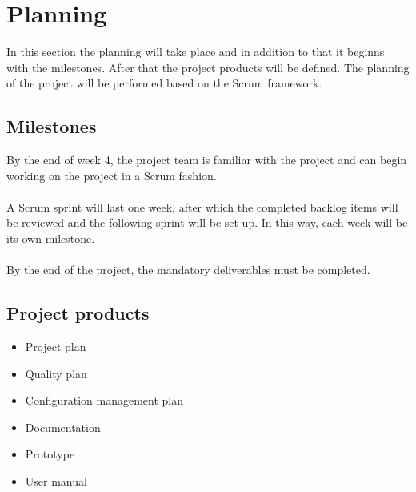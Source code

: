 \section{Planning}
In this section the planning will take place and in addition to that it beginns with the milestones.
After that the project products will be defined. The planning of the project will be performed based on the Scrum framework.

    \subsection{Milestones}
    By the end of week 4, the project team is familiar with the project and can begin working on the project in a Scrum fashion.\\\\
    A Scrum sprint will last one week, after which the completed backlog items will be reviewed and the following sprint will be set up. In this way, each week will be its own milestone.\\\\
    By the end of the project, the mandatory deliverables must be completed.
    
    \subsection{Project products}
    \begin{itemize}
        \item Project plan
        \item Quality plan
        \item Configuration management plan
        \item Documentation
        \item Prototype
        \item User manual
    \end{itemize}
